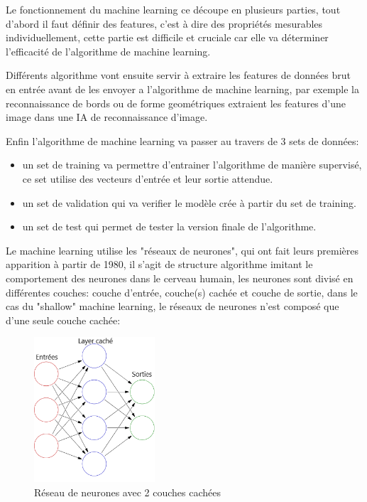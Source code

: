 Le fonctionnement du machine learning ce découpe en plusieurs parties,
tout d'abord il faut définir des features, c'est à dire des
propriétés mesurables individuellement, cette partie est difficile et cruciale
car elle va déterminer l'efficacité de l'algorithme de machine learning. \newline

Différents algorithme vont ensuite servir à extraire les features de données 
brut en entrée avant de les envoyer a l'algorithme de machine learning, par exemple 
la reconnaissance de bords ou de forme geométriques extraient les features d'une 
image dans une IA de reconnaissance d'image. \newline 

Enfin l'algorithme de machine learning va passer au travers de 3 sets de données:
\begin{itemize}
    \item un set de training va permettre d'entrainer l'algorithme de manière
     supervisé, ce set utilise des vecteurs d'entrée et leur sortie attendue.
    \item un set de validation qui va verifier le modèle crée à partir du set de 
    training.
    \item un set de test qui permet de tester la version finale de l'algorithme. 
    \newline
\end{itemize}

Le machine learning utilise les "réseaux de neurones", qui ont fait leurs premières 
apparition à partir de 1980, il s'agit de structure algorithme imitant 
le comportement des neurones dans le cerveau humain, 
les neurones sont divisé en différentes couches: couche d'entrée, couche(s) cachée
et couche de sortie, dans le cas du "shallow" machine learning, le réseaux de neurones 
n'est composé que d'une seule couche cachée: 

\begin{figure}[!h]
    \centering
    \includegraphics[width=0.4\textwidth]{Images/shallownnoverview}
    \caption{Réseau de neurones avec 2 couches cachées}
	\label{fig:NN2Layers}
\end{figure}

